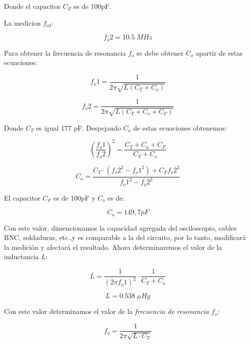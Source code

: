 Donde el capacitor $C_F$ es de 100pF.

La medicion $f_{o2}$:

\begin{equation}
    \boxed{f_o2 = 10.5\; MHz}
\end{equation}

Para obtener la frecuencia de resonancia $f_o$ se debe obtener $C_o$ apartir de estas ecuaciones:

\begin{equation}
    f_o1 = \frac{1}{2\pi\sqrt{L(C_T + C_o)}}
\end{equation}

\begin{equation}
    f_o2 = \frac{1}{2\pi\sqrt{L(C_T + C_o + C_F)}}
\end{equation}

Donde $C_T$ es igual 177 pF. Despejando $C_o$ de estas ecuaciones obtenemos:

\begin{equation}
    (\frac{f_o1}{f_o2})^2 = \frac{C_T + C_o + C_F}{C_T + C_o}
\end{equation}

\begin{equation}
    C_o = \frac{C_T \cdot (f_o2^2 - f_o1^2) + C_F f_o2^2}{f_o1^2 - f_o2^2}
\end{equation}

El capacitor $C_F$ es de 100pF y $C_o$ es de:

\begin{equation}
    \boxed{C_o = 149,7 pF}
\end{equation}

Con este valor, dimencionamos la capacidad agregada del osciloscopio, cables BNC, soldaduras, etc.,y es comparable a la del 
circuito, por lo tanto, modificará la medición y afectará el resultado. Ahora determinaremos el valor de la inductancia $L$:

\begin{equation}
    L = \frac{1}{(2\pi f_o1)^2} \cdot \frac{1}{C_T + C_o}
\end{equation}

\begin{equation}
    \boxed{L = 0.538\; \mu Hy}
\end{equation}

Con este valor determinamos el valor de la \textit{frecuencia de resonancia $f_o$}:

\begin{equation}
    f_o = \frac{1}{2\pi\sqrt{L \cdot C_T}}
\end{equation}

